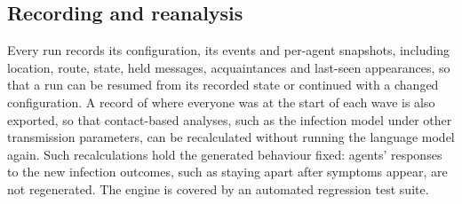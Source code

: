 \subsection{Recording and reanalysis}
\label{sec:methods:recording}

Every run records its configuration, its events and per-agent snapshots, including location, route, state, held messages, acquaintances and last-seen appearances, so that a run can be resumed from its recorded state or continued with a changed configuration. A record of where everyone was at the start of each wave is also exported, so that contact-based analyses, such as the infection model under other transmission parameters, can be recalculated without running the language model again. Such recalculations hold the generated behaviour fixed: agents' responses to the new infection outcomes, such as staying apart after symptoms appear, are not regenerated. The engine is covered by an automated regression test suite.
